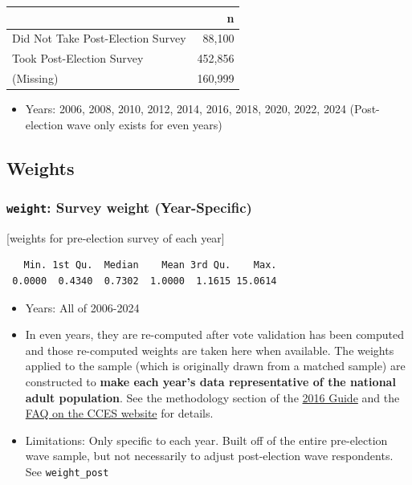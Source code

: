 \documentclass[10pt,article,oneside]{memoir}
\begin{document}
\begin{table}[H]
\centering
\begin{tabular}[t]{lr}
\toprule
 & n\\
\midrule
Did Not Take Post-Election Survey & 88,100\\
Took Post-Election Survey & 452,856\\
(Missing) & 160,999\\
\bottomrule
\end{tabular}
\end{table}

\begin{itemize}
\tightlist
\item
  Years: 2006, 2008, 2010, 2012, 2014, 2016, 2018, 2020, 2022, 2024
  (Post-election wave only exists for even years)
\end{itemize}

\FloatBarrier

\subsection{Weights}\label{weights}

\subsubsection{\texorpdfstring{\texttt{weight}: Survey weight
(Year-Specific)}{weight: Survey weight (Year-Specific)}}\label{weight-survey-weight-year-specific}

{[}weights for pre-election survey of each year{]}

\begin{verbatim}
   Min. 1st Qu.  Median    Mean 3rd Qu.    Max. 
 0.0000  0.4340  0.7302  1.0000  1.1615 15.0614 
\end{verbatim}

\begin{itemize}
\tightlist
\item
  Years: All of 2006-2024
\item
  In even years, they are re-computed after vote validation has been
  computed and those re-computed weights are taken here when available.
  The weights applied to the sample (which is originally drawn from a
  matched sample) are constructed to \textbf{make each year's data
  representative of the national adult population}. See the methodology
  section of the
  \href{https://dataverse.harvard.edu/api/access/datafile/3047286}{2016
  Guide} and the
  \href{https://cces.gov.harvard.edu/frequently-asked-questions}{FAQ on
  the CCES website} for details.
\item
  Limitations: Only specific to each year. Built off of the entire
  pre-election wave sample, but not necessarily to adjust post-election
  wave respondents. See \texttt{weight\_post}
\end{itemize}
\end{document}
